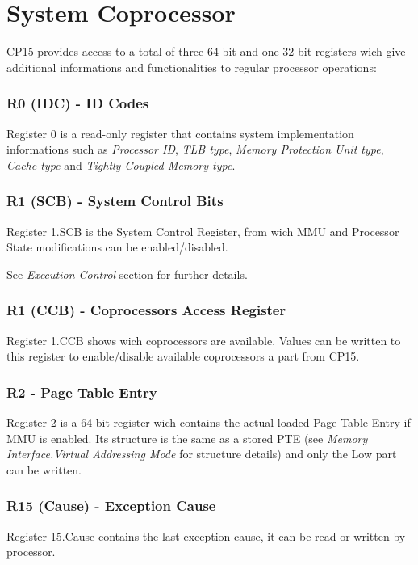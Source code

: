 \section{System Coprocessor}

CP15 provides access to a total of three 64-bit and one 32-bit registers wich give additional informations and functionalities to regular processor operations:

\subsubsection{R0 (IDC) - ID Codes}
Register 0 is a read-only register that contains system implementation informations such as \emph{Processor ID}, \emph{TLB type}, \emph{Memory Protection Unit type}, \emph{Cache type} and \emph{Tightly Coupled Memory type}.

\subsubsection{R1 (SCB) - System Control Bits}
Register 1.SCB is the System Control Register, from wich MMU and Processor State modifications can be enabled/disabled.

See \emph{Execution Control} section for further details.

\subsubsection{R1 (CCB) - Coprocessors Access Register}
Register 1.CCB shows wich coprocessors are available. Values can be written to this register to enable/disable available coprocessors a part from CP15.



\subsubsection{R2 - Page Table Entry}
Register 2 is a 64-bit register wich contains the actual loaded Page Table Entry if MMU is enabled. Its structure is the same as a stored PTE (see \emph{Memory Interface.Virtual Addressing Mode} for structure details) and only the Low part can be written.

\subsubsection{R15 (Cause) - Exception Cause}
Register 15.Cause contains the last exception cause, it can be read or written by processor.

